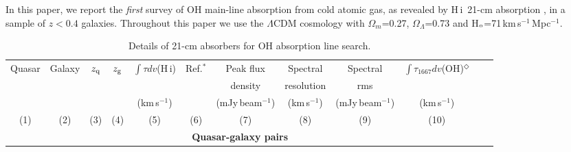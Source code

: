 \documentclass[iop,apjl,numberedappendix,appendixfloats,twocolappendix,revtex4]{emulateapj}
\newcommand{\hi}{\mbox{H\,{\sc i}}}
\newcommand{\zq}{$z_{\rm q}$}
\newcommand{\zg}{$z_{\rm g}$}
\newcommand{\kms}{km\,s$^{-1}$}
\begin{document}
In this paper, we report the {\it first} survey of OH main-line absorption from cold atomic gas, as revealed by \hi\ 21-cm absorption \citep[][]{Heiles03},  
 in a sample of $z<0.4$ galaxies. Throughout this paper we use the $\Lambda$CDM 
cosmology with $\Omega_m$=0.27, $\Omega_\Lambda$=0.73 and H$_{\rm o}$=71\,\kms\,Mpc$^{-1}$. 

\begin{table*}
\caption{Details of 21-cm absorbers for OH absorption line search.}
\vspace{-0.4cm}
\begin{center}
\begin{tabular}{cccccccccccc}
\hline
\hline
Quasar             &    Galaxy           & \zq  & \zg    &  $\int\tau dv$(\hi) &  Ref.$^*$ &  Peak flux& Spectral &  Spectral        &  $\int\tau_{1667} dv$(OH)$^\Diamond$ \\  
                   &                     &      &        &                     &       &   density &   resolution              &    rms           &                          \\        
                   &                     &      &        &   (\kms)            &       &(mJy\,beam$^{-1}$)   & (\kms)    &(mJy\,beam$^{-1}$)&      (\kms)              \\ 
(1)                &      (2)            & (3)  & (4)    &    (5)              &  (6)  &     (7)    &    (8)    &       (9)        &     (10)                          \\         
\hline                                                                                                                                                                                                  
\multicolumn{10}{c}{\bf {Quasar-galaxy pairs}}   \\                     


\end{tabular}
\end{center}
\end{table*}
\end{document}
